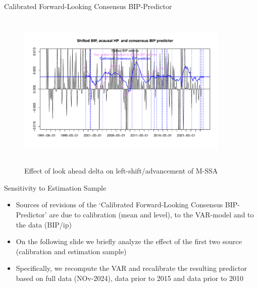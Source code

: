 \documentclass{beamer}
\begin{document}
\begin{frame} {Calibrated Forward-Looking Consensus BIP-Predictor}
\begin{figure}[H]\begin{center}\includegraphics[height=3in, width=4in]{bip_predictor3.pdf}\caption{Effect of look ahead delta on  left-shift/advancement of M-SSA\label{cor}}\end{center}\end{figure}\end{frame}


\begin{frame} {Sensitivity to Estimation Sample }
\begin{itemize}
\item Sources of revisions of the `Calibrated Forward-Looking Consensus BIP-Predictor' are due to calibration (mean and level),  to the VAR-model and to the data (BIP/ip)
\item On the following slide we briefly analyze the effect of the first two source (calibration and estimation sample)
\item Specifically, we recompute the VAR and recalibrate the resulting predictor based on full data (NOv-2024), data prior to 2015 and data prior to 2010
\end{itemize}
\end{frame}
\end{document}
